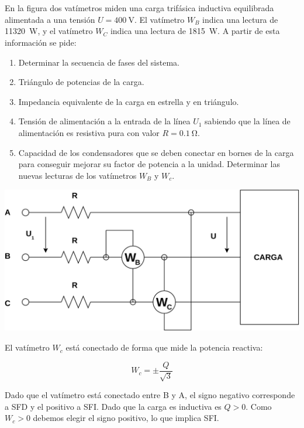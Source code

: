 \documentclass[12pt]{article}
\begin{document}
\section{}

En la figura dos vatímetros miden una carga trifásica inductiva
equilibrada alimentada a una tensión $U = \SI{400}{\volt}$. El
vatímetro $W_B$ indica una lectura de \SI{11320}{\watt}, y el
vatímetro $W_C$ indica una lectura de \SI{1815}{\watt}. A partir de
esta información se pide:

\begin{enumerate}
\item Determinar la secuencia de fases del sistema.
\item Triángulo de potencias de la carga.
\item Impedancia equivalente de la carga en estrella y
  en triángulo.
\item Tensión de alimentación a la entrada de la línea
  $U_1$ sabiendo que la línea de alimentación es resistiva pura con
  valor $R = \SI{0.1}{\ohm}$.
\item Capacidad de los condensadores que se deben
  conectar en bornes de la carga para conseguir mejorar su factor de
  potencia a la unidad. Determinar las nuevas lecturas de los
  vatímetros $W_B$ y $W_c$.
\end{enumerate}

\begin{center}
  \includegraphics[height=0.3\textheight]{figs/Esquema.pdf}
\end{center}

\noindent\hrulefill

El vatímetro $W_c$ está conectado de forma que mide la potencia
reactiva:

\[
  W_c = \pm \frac{Q}{\sqrt{3}}
\]

Dado que el vatímetro está conectado entre B y A, el signo negativo
corresponde a SFD y el positivo a SFI. Dado que la carga es inductiva
es $Q > 0$. Como $W_c > 0$ debemos elegir el signo positivo, lo que
implica SFI.
\end{document}
